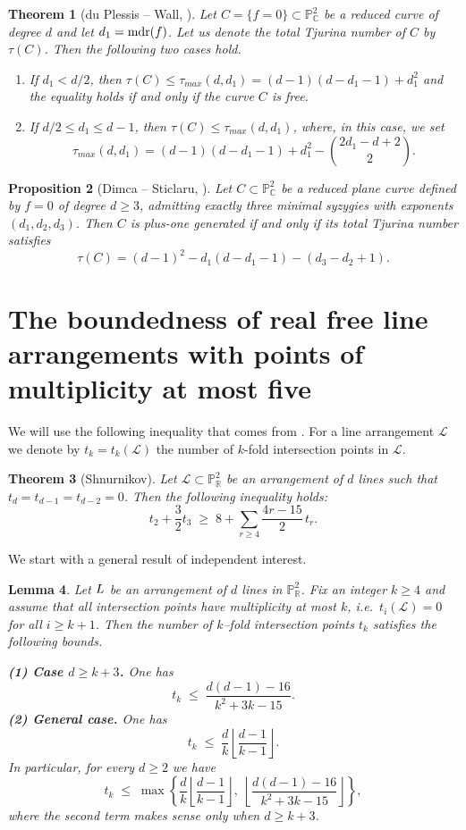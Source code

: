 \documentclass[11pt]{article}
\theoremstyle{plain}
\newtheorem{theorem}{Theorem}[section]
\newtheorem{lemma}[theorem]{Lemma}
\newtheorem{proposition}[theorem]{Proposition}
\theoremstyle{definition}
\theoremstyle{remark}
\newcommand{\R}{\mathbb{R}}
\newcommand{\C}{\mathbb{C}}
\newcommand{\LL}{\mathcal{L}}
\begin{document}
\begin{theorem}[{du Plessis -- Wall, \cite{duP}}]
\label{dup}
Let $C = \{f=0\}\subset \mathbb{P}^{2}_{\mathbb{C}}$ be a reduced curve of degree $d$ and let $d_1 = {\rm mdr}(f)$. Let us denote the total Tjurina number of $C$ by $\tau(C)$.
Then the following two cases hold.
\begin{enumerate}
\item[a)] If $d_1 < d/2$, then $\tau(C) \leq \tau_{max}(d,d_1 )= (d-1)(d-d_1-1)+d_{1}^2$ and the equality holds if and only if the curve $C$ is free.
\item[b)] If $d/2 \leq d_{1} \leq d-1$, then
$\tau(C) \leq \tau_{max}(d,d_{1})$,
where, in this case, we set
$$\tau_{max}(d,d_{1})=(d-1)(d-d_{1}-1)+d_{1}^2- \binom{2d_{1}-d+2}{2}.$$
\end{enumerate}
\end{theorem}

\begin{proposition}[{Dimca -- Sticlaru, \cite{DS20}}]\label{prop:DimStr}
Let $C \subset \mathbb{P}^2_\C$ be a reduced plane curve defined by $f=0$ of degree $d \ge 3$, admitting exactly three minimal syzygies with exponents $(d_1,d_2,d_3)$.  
Then $C$ is plus-one generated if and only if its total Tjurina number satisfies
\[
\tau(C) = (d-1)^2 - d_1(d-d_1-1) - (d_3-d_2+1).
\]
\end{proposition}



\section{The boundedness of real free line arrangements with points of multiplicity at most five}
 We will use the following inequality that comes from \cite{Sh}. For a line arrangement $\mathcal{L}$ we denote by $t_{k} = t_{k}(\mathcal{L})$ the number of $k$-fold intersection points in $\mathcal{L}$.
\begin{theorem}[Shnurnikov]
Let $\mathcal{L} \subset \mathbb{P}^{2}_{\mathbb{R}}$ be an arrangement of $d$ lines such that $t_{d}=t_{d-1}=t_{d-2} = 0$. Then the following inequality holds:
\[ t_2 + \frac{3}{2}t_3 \;\ge\; 8 + \sum_{r\ge 4}\frac{4r-15}{2}\,t_r.\]
\end{theorem}
We start with a general result of independent interest.
\begin{lemma}\label{thm:tk_global_bound}
Let $\mathcal \LL$ be an arrangement of $d$ lines in $\mathbb{P}^2_\R$.
Fix an integer $k\ge 4$ and assume that all intersection points have multiplicity at most $k$,
i.e.\ $t_i(\mathcal L)=0$ for all $i\ge k+1$. Then the number of $k$--fold
intersection points $t_{k}$ satisfies the following bounds.

\smallskip
\noindent\textbf{(1) Case $d\ge  k+3$.} One has
\[
t_k \;\le\; \frac{d(d-1)-16}{k^2+3k-15}.
\]
\smallskip
\noindent\textbf{(2) General case.} One has
\[
t_k \;\le\; \frac{d}{k}\left\lfloor\frac{d-1}{k-1}\right\rfloor .
\]
\smallskip
In particular, for every $d\ge 2$ we have
\[
t_k \;\le\;
\max\!\left\{
\frac{d}{k}\left\lfloor\frac{d-1}{k-1}\right\rfloor,\;
\left\lfloor\frac{d(d-1)-16}{k^2+3k-15}\right\rfloor
\right\},
\]
where the second term makes sense only when $d\ge k+3$.
\end{lemma}
\end{document}
